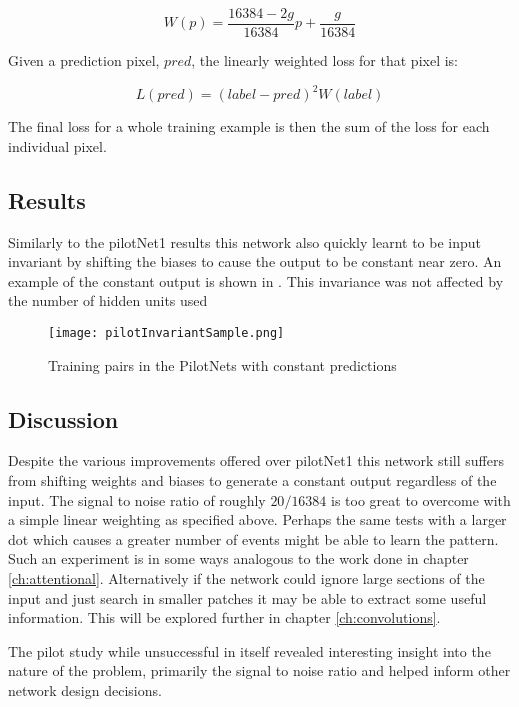 \begin{equation}
    \label{eq:weightedPenalty}
    W(p) = \frac{16384 - 2g}{16384} p + \frac{g}{16384}
\end{equation}

Given a prediction pixel, $pred$, the linearly weighted loss for that pixel is:

\begin{equation}
    \label{eq:linearLoss}
    L(pred) = (label - pred)^2 W(label)
\end{equation}

The final loss for a whole training example is then the sum of the loss for each individual pixel. 

\subsection{Results} 
Similarly to the pilotNet1 results this network also quickly learnt to be input invariant by shifting the biases to cause the output to be constant near zero. 
An example of the constant output is shown in . 
This invariance was not affected by the number of hidden units used

\begin{figure}[h]
    \centering
    \texttt{[image: pilotInvariantSample.png]}
    \caption{Training pairs in the PilotNets with constant predictions}
    \label{fig:pilotInvarianceSample}
\end{figure}


\subsection{Discussion}
Despite the various improvements offered over pilotNet1 this network still suffers from shifting weights and biases to generate a constant output regardless of the input. 
The signal to noise ratio of roughly $20/16384$ is too great to overcome with a simple linear weighting as specified above.
Perhaps the same tests with a larger dot which causes a greater number of events might be able to learn the pattern. 
Such an experiment is in some ways analogous to the work done in chapter \ref{ch:attentional}. 
Alternatively if the network could ignore large sections of the input and just search in smaller patches it may be able to extract some useful information.
This will be explored further in chapter \ref{ch:convolutions}. 

The pilot study while unsuccessful in itself revealed interesting insight into the nature of the problem, primarily the signal to noise ratio and helped inform other network design decisions.
 

